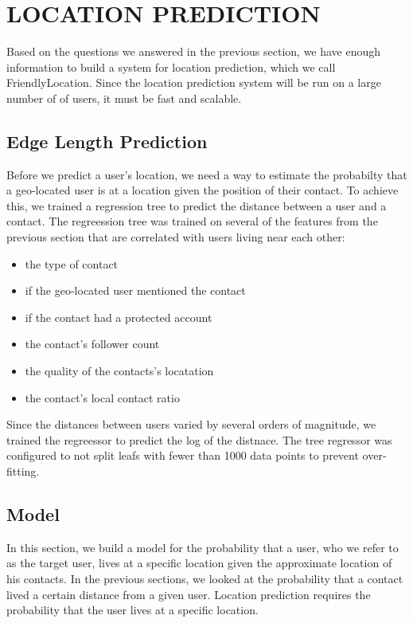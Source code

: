 \chapter{\uppercase{Location Prediction}}

Based on the questions we answered in the previous section, we have enough
information to build a system for location prediction, which we call
FriendlyLocation.
Since the location prediction system will be run on a large number of of users,
it must be fast and scalable.

\section{Edge Length Prediction}

Before we predict a user's location, we need a way to estimate the probabilty
that a geo-located user is at a location given the position of their contact.
%
To achieve this, we trained a regression tree to predict the distance between a
user and a contact.
%
The regreession tree was trained on several of the features from the previous
section that are correlated with users living near each other:
\begin{itemize}
\item the type of contact
\item if the geo-located user mentioned the contact
\item if the contact had a protected account
\item the contact's follower count
\item the quality of the contacts's locatation
\item the contact's local contact ratio
\end{itemize}
%
Since the distances between users varied by several orders of magnitude, we
trained the regreessor to predict the log of the distnace.
%
The tree regressor was configured to not split leafs with fewer than 1000 data
points to prevent over-fitting.


\section{Model}
\label{sec:model}

In this section, we build a model for the probability that a user, who we refer
to as the target user, lives at a specific location given the approximate
location of his contacts.
%
In the previous sections, we looked at the probability that a contact lived a
certain distance from a given user.
%
Location prediction requires the probability that the user lives at a specific
location.


